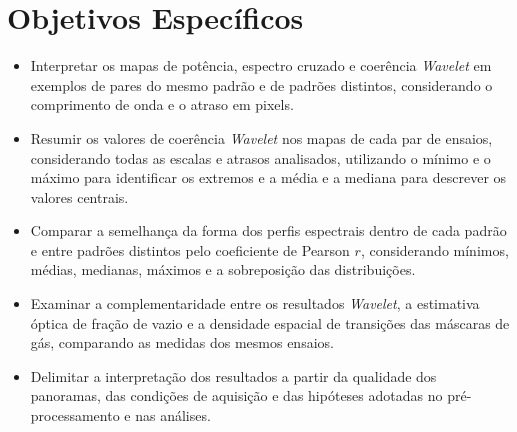 \section{Objetivos Específicos}

\begin{itemize}
  \item Interpretar os mapas de potência, espectro cruzado e coerência
  \textit{Wavelet} em exemplos de pares do mesmo padrão e de padrões distintos,
  considerando o comprimento de onda e o atraso em pixels.
  \item Resumir os valores de coerência \textit{Wavelet} nos mapas de cada par de
  ensaios, considerando todas as escalas e atrasos analisados, utilizando o
  mínimo e o máximo para identificar os extremos e a média e a mediana para
  descrever os valores centrais.
  \item Comparar a semelhança da forma dos perfis espectrais dentro de cada padrão
  e entre padrões distintos pelo coeficiente de Pearson $r$, considerando
  mínimos, médias, medianas, máximos e a sobreposição das distribuições.
  \item Examinar a complementaridade entre os resultados \textit{Wavelet}, a estimativa
  óptica de fração de vazio e a densidade espacial de transições das máscaras
  de gás, comparando as medidas dos mesmos ensaios.
  \item Delimitar a interpretação dos resultados a partir da qualidade dos
  panoramas, das condições de aquisição e das hipóteses adotadas no
  pré-processamento e nas análises.
\end{itemize}

